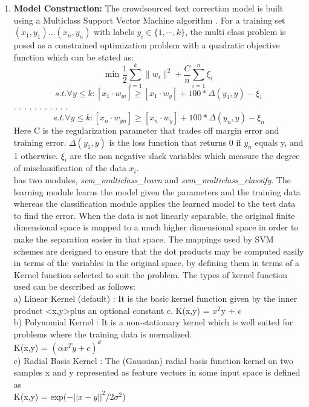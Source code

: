 \documentclass[letterpaper]{article}
\begin{document}
\begin{enumerate}
\item \textbf{Model Construction: } The crowdsourced text correction model is built using a Multiclass Support Vector Machine algorithm \cite{algo}. For a training set $(x_1,y_1) ... (x_n,y_n)$ with labels $y_i \in \{1, \cdots, k\}$, the multi class problem is posed as a constrained optimization problem with a quadratic objective function which can be stated as: \\
\begin{equation}
\text{min } \frac{1}{2} \sum_{i = 1}^{k} \parallel w_{i}\parallel^2 + \frac{C}{n} \sum_{i = 1}^{n}\xi_{i} 
\end{equation}
\begin{equation*}
s.t. \forall y \leq k : [x_{1} \cdot w_{yi}] \geq [x_{1} \cdot w_{y}] + 100*\Delta(y_{1},y)-\xi_{1}
\end{equation*}
 . . . . . . . . . . .
\begin{equation*}
s.t. \forall y \leq k : [x_{n} \cdot w_{yn}] \geq [x_{n} \cdot w_{y}] + 100*\Delta(y_{n},y)-\xi_{n} 
\end{equation*}
Here C is the regularization parameter that trades off margin error and training error. $\Delta(y_{1},y)$ is the loss function that returns 0 if $y_{n}$ equals y, and 1 otherwise. $\xi_{i}$ are the non negative slack variables which measure the degree of misclassification of the data $x_{i}$. \\
\cite{algo} has two modules, \textit{svm\_multiclass\_learn} and \textit{svm\_multiclass\_classify}. The learning module learns the model given the parameters and the training data whereas the classification module applies the learned model to the test data to find the error. When the data is not linearly separable, the original finite dimensional space is mapped to a much higher dimensional space in order to make the separation easier in that space. The mappings used by SVM schemes are designed to ensure that the dot products may be computed easily in terms of the variables in the original space, by defining them in terms of a Kernel function selected to suit the problem. The types of kernel function used can be described as follows:\\
a) Linear Kernel (default) : It is the basic kernel function given by the inner product \textless x,y\textgreater plus an optional constant c. K(x,y) = $x^{T}$y + c \\
b) Polynomial Kernel : It is a non-stationary kernel which is well suited for problems where the training data is normalized. \\
K(x,y) = $(\alpha x^{T}y + c)^{d}$ \\
c) Radial Basis Kernel : The (Gaussian) radial basis function kernel on two samples x and y represented as feature vectors in some input space is defined as \\
K(x,y) = exp($-\lvert \lvert x-y\rvert\rvert^{2}$/2$\sigma^{2}$)



\end{enumerate}
\end{document}
